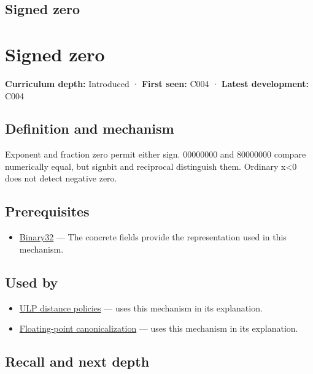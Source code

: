 \hypertarget{appendix-3a048f032c1f}{}
\section*{Signed zero}
\chapter{Signed zero}\label{appendix-3a048f032c1f-signed-zero}

\textbf{Curriculum depth:} Introduced · \textbf{First seen:} C004 · \textbf{Latest development:} C004

\section{Definition and mechanism}\label{appendix-3a048f032c1f-definition-and-mechanism}

Exponent and fraction zero permit either sign. 00000000 and 80000000 compare numerically equal, but signbit and reciprocal distinguish them. Ordinary x\textless0 does not detect negative zero.

\section{Prerequisites}\label{appendix-3a048f032c1f-prerequisites}

\begin{itemize}
\tightlist
\item
  \hyperref[appendix-5057f9ad327f]{Binary32} --- The concrete fields provide the representation used in this mechanism.
\end{itemize}

\section{Used by}\label{appendix-3a048f032c1f-used-by}

\begin{itemize}
\tightlist
\item
  \hyperref[appendix-deca299ae4b8]{ULP distance policies} --- uses this mechanism in its explanation.
\item
  \hyperref[appendix-e90053a4b201]{Floating-point canonicalization} --- uses this mechanism in its explanation.
\end{itemize}

\section{Recall and next depth}\label{appendix-3a048f032c1f-recall-and-next-depth}

